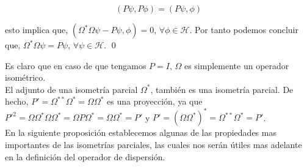 \documentclass[12pt]{book}
\numberwithin{equation}{chapter}
\def\H{\mathcal{H}}
\def\O{\Omega}
\begin{document}
$$ ( P\psi , P \phi )= (  P\psi , \phi ) $$

esto implica que, $  ( \O^{*} \O \psi - P\psi , \phi ) = 0 $, $ \forall \phi \in \H $. Por tanto podemos concluir que, $ \O^{*} \O \psi = P \psi $, $ \forall \psi \in \H $. \qed 

\vspace{5 mm}

Es claro que en caso de que tengamos $P= I$, $\O$ es simplemente un operador isom\'etrico.\\

El adjunto de una isometr\'ia parcial $\O^{*}$, tambi\'en es una isometr\'ia parcial. De hecho, $ P' = \O^{**} \O^{*}= \O \O^{*} $ es una proyecci\'on, ya que $ P'^{2}= \O \O^{*} \O \O^{*} = \O P \O^{*}= \O \O^{*}=P' $ y $ P'=( \O \O^{*} )^{*}= \O^{**} \O^{*} =P' $.\\
En la siguiente proposici\'on establecemos algunas de las propiedades mas importantes de las isometr\'ias parciales, las cuales nos ser\'an \'utiles mas adelante en la definici\'on del operador de dispersi\'on.\\ 
\end{document}
